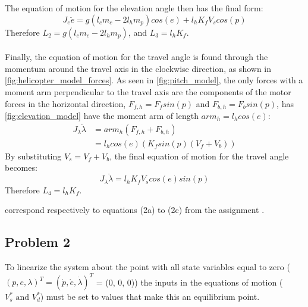 The equation of motion for the elevation angle then has the final form:
\begin{equation}
  \label{eq:elevation EoM}
  J_e\ddot{e} = g(l_cm_c - 2l_hm_p)cos(e) + l_hK_fV_scos(p)
\end{equation}
%
Therefore $L_2 = g(l_cm_c-2l_hm_p)$, and $L_3 = l_hK_f$.
\\ \\
Finally, the equation of motion for the travel angle is found through
the momentum around the travel axis in the  clockwise direction, as
shown in \cref{fig:helicopter_model_forces}. As seen in
\cref{fig:pitch_model}, the only forces with a moment arm
perpendicular to the travel axis are the components of the motor
forces in the horizontal direction, $F_{f,h} = F_fsin(p)$ and $F_{b,h}
= F_bsin(p)$, has \cref{fig:elevation_model} have the moment arm of
length $arm_h = l_hcos(e)$:
%
\begin{align*}
  J_\lambda\ddot{\lambda} &= arm_h(F_{f,h} + F_{b,h}) \\
                         &= l_hcos(e)(K_fsin(p)(V_f + V_b))
\end{align*}
%
By substituting $V_s = V_f + V_b$, the final equation of
motion for the travel angle becomes:
%
\begin{equation}
  \label{eq:travel EoM}
  J_\lambda\ddot{\lambda} = l_hK_fV_scos(e)sin(p)
\end{equation}
%
Therefore $L_4 = l_hK_f$.

  correspond respectively to equations
(2a) to (2c) from the assignment \cite[p.13]{assignment}.
%
\subsection{Problem 2}
To linearize the system about the point with all state variables equal
to zero ($(p, e, \lambda)^T = (\dot{p},\dot{e},\dot{\lambda})^T $ = (0, 0, 0))
the inputs in the equations of motion ($V^{*}_{s} \text{ and }
V^{*}_{d}$) must be set to values that make this an equilibrium point.

